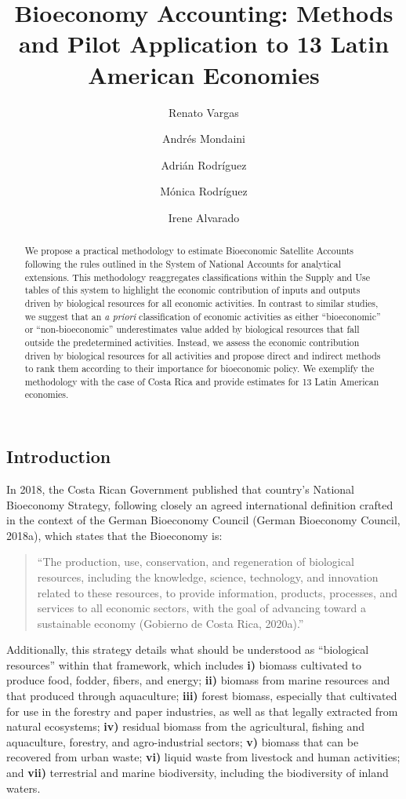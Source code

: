 \documentclass[
  letterpaper,
  DIV=11,
  numbers=noendperiod]{scrartcl}
\title{Bioeconomy Accounting: Methods and Pilot Application to 13 Latin
American Economies}
\author{Renato Vargas \and Andrés Mondaini \and Adrián
Rodríguez \and Mónica Rodríguez \and Irene Alvarado}
\date{}
\begin{document}
\maketitle
\begin{abstract}
We propose a practical methodology to estimate Bioeconomic Satellite
Accounts following the rules outlined in the System of National Accounts
for analytical extensions. This methodology reaggregates classifications
within the Supply and Use tables of this system to highlight the
economic contribution of inputs and outputs driven by biological
resources for all economic activities. In contrast to similar studies,
we suggest that an \emph{a priori} classification of economic activities
as either ``bioeconomic'' or ``non-bioeconomic'' underestimates value
added by biological resources that fall outside the predetermined
activities. Instead, we assess the economic contribution driven by
biological resources for all activities and propose direct and indirect
methods to rank them according to their importance for bioeconomic
policy. We exemplify the methodology with the case of Costa Rica and
provide estimates for 13 Latin American economies.
\end{abstract}

\subsection{Introduction}\label{introduction}

In 2018, the Costa Rican Government published that country's National
Bioeconomy Strategy, following closely an agreed international
definition crafted in the context of the German Bioeconomy Council
(German Bioeconomy Council, 2018a), which states that the Bioeconomy is:

\begin{quote}
``The production, use, conservation, and regeneration of biological
resources, including the knowledge, science, technology, and innovation
related to these resources, to provide information, products, processes,
and services to all economic sectors, with the goal of advancing toward
a sustainable economy (Gobierno de Costa Rica, 2020a).''
\end{quote}

Additionally, this strategy details what should be understood as
``biological resources'' within that framework, which includes
\textbf{i)} biomass cultivated to produce food, fodder, fibers, and
energy; \textbf{ii)} biomass from marine resources and that produced
through aquaculture; \textbf{iii)} forest biomass, especially that
cultivated for use in the forestry and paper industries, as well as that
legally extracted from natural ecosystems; \textbf{iv)} residual biomass
from the agricultural, fishing and aquaculture, forestry, and
agro-industrial sectors; \textbf{v)} biomass that can be recovered from
urban waste; \textbf{vi)} liquid waste from livestock and human
activities; and \textbf{vii)} terrestrial and marine biodiversity,
including the biodiversity of inland waters.
\end{document}
